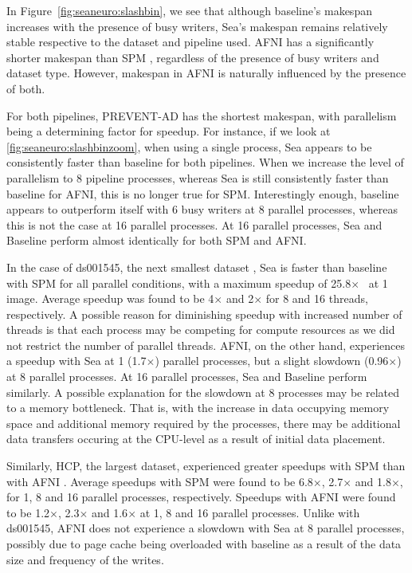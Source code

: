 In Figure~\ref{fig:seaneuro:slashbin}, we see that although baseline's makespan increases with the presence of busy writers,
Sea's makespan remains relatively stable respective to the dataset and pipeline used. AFNI has a significantly shorter makespan
than SPM , regardless of the presence of busy writers and dataset type. However, makespan in AFNI is naturally influenced by the presence of both.

For both  pipelines, PREVENT-AD has the shortest makespan, with parallelism being a determining factor for speedup. For instance, if we look
at \ref{fig:seaneuro:slashbinzoom}, when using a single process, Sea appears to be consistently faster than baseline for both pipelines.
When we increase the level of parallelism to 8 pipeline processes, whereas Sea is still consistently faster than baseline for AFNI, this
is no longer true for SPM. Interestingly enough, baseline appears to outperform itself with 6 busy writers at 8 parallel processes, whereas
this is not the case at 16 parallel processes. At 16 parallel processes, Sea and Baseline perform almost identically for both SPM and AFNI.

In the case of ds001545, the next smallest dataset , Sea is faster than baseline with SPM for all parallel conditions, with a maximum speedup of 25.8$\times$~ at 1 image.
Average speedup was found to be 4$\times$ and 2$\times$ for 8 and 16 threads, respectively. A possible reason for diminishing speedup with increased number of 
threads is that each process may be competing for compute resources as we did not restrict the number of parallel threads.
AFNI, on the other hand, experiences a speedup with Sea at 1 (1.7$\times$) parallel processes, but a slight slowdown (0.96$\times$) at 8 parallel processes.
At 16 parallel processes, Sea and Baseline perform similarly. A possible explanation for the slowdown at 8 processes may be related to a memory bottleneck. That is, with the increase in data occupying memory space and additional memory required by the processes, there may be additional data transfers occuring at the CPU-level as a result of initial data placement.

Similarly, HCP, the largest dataset, experienced greater speedups with SPM than with AFNI . Average speedups with
SPM were found to be 6.8$\times$, 2.7$\times$ and 1.8$\times$, for 1, 8 and 16 parallel processes, respectively. Speedups with AFNI
were found to be 1.2$\times$, 2.3$\times$ and 1.6$\times$ at 1, 8 and 16 parallel processes. Unlike with ds001545, AFNI does not experience a slowdown with Sea at 8 parallel processes, possibly due to page cache being overloaded with baseline as a result of the data size and frequency of the writes.

